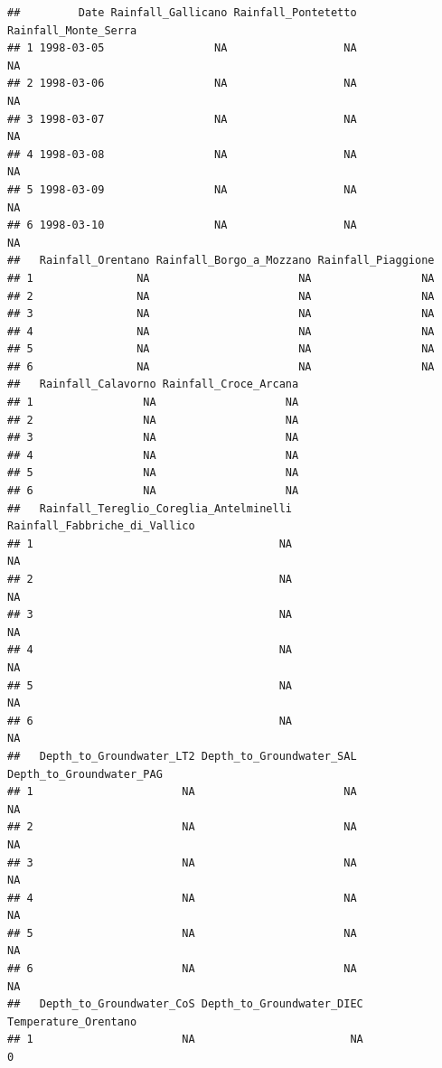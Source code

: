 \documentclass[
]{article}
\begin{document}
\begin{verbatim}
##         Date Rainfall_Gallicano Rainfall_Pontetetto Rainfall_Monte_Serra
## 1 1998-03-05                 NA                  NA                   NA
## 2 1998-03-06                 NA                  NA                   NA
## 3 1998-03-07                 NA                  NA                   NA
## 4 1998-03-08                 NA                  NA                   NA
## 5 1998-03-09                 NA                  NA                   NA
## 6 1998-03-10                 NA                  NA                   NA
##   Rainfall_Orentano Rainfall_Borgo_a_Mozzano Rainfall_Piaggione
## 1                NA                       NA                 NA
## 2                NA                       NA                 NA
## 3                NA                       NA                 NA
## 4                NA                       NA                 NA
## 5                NA                       NA                 NA
## 6                NA                       NA                 NA
##   Rainfall_Calavorno Rainfall_Croce_Arcana
## 1                 NA                    NA
## 2                 NA                    NA
## 3                 NA                    NA
## 4                 NA                    NA
## 5                 NA                    NA
## 6                 NA                    NA
##   Rainfall_Tereglio_Coreglia_Antelminelli Rainfall_Fabbriche_di_Vallico
## 1                                      NA                            NA
## 2                                      NA                            NA
## 3                                      NA                            NA
## 4                                      NA                            NA
## 5                                      NA                            NA
## 6                                      NA                            NA
##   Depth_to_Groundwater_LT2 Depth_to_Groundwater_SAL Depth_to_Groundwater_PAG
## 1                       NA                       NA                       NA
## 2                       NA                       NA                       NA
## 3                       NA                       NA                       NA
## 4                       NA                       NA                       NA
## 5                       NA                       NA                       NA
## 6                       NA                       NA                       NA
##   Depth_to_Groundwater_CoS Depth_to_Groundwater_DIEC Temperature_Orentano
## 1                       NA                        NA                    0

\end{verbatim}
\end{document}
